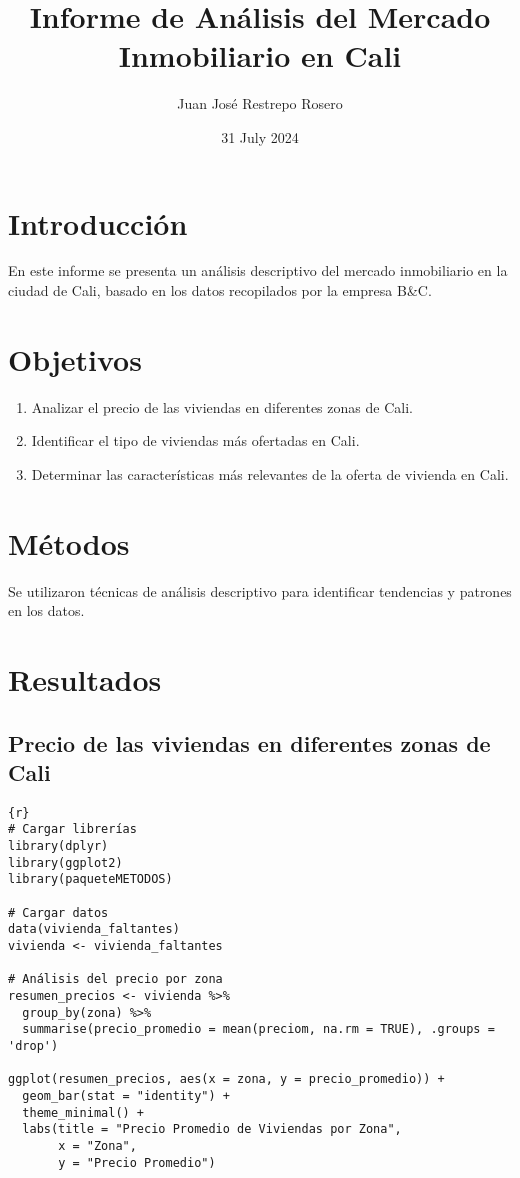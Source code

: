 \documentclass[
]{article}
\title{Informe de Análisis del Mercado Inmobiliario en Cali}
\author{Juan José Restrepo Rosero}
\date{31 July 2024}
\providecommand{\tightlist}{%
  \setlength{\itemsep}{0pt}\setlength{\parskip}{0pt}}
\begin{document}
\maketitle

\section{Introducción}\label{introducciuxf3n}

En este informe se presenta un análisis descriptivo del mercado
inmobiliario en la ciudad de Cali, basado en los datos recopilados por
la empresa B\&C.

\section{Objetivos}\label{objetivos}

\begin{enumerate}
\def\labelenumi{\arabic{enumi}.}
\tightlist
\item
  Analizar el precio de las viviendas en diferentes zonas de Cali.
\item
  Identificar el tipo de viviendas más ofertadas en Cali.
\item
  Determinar las características más relevantes de la oferta de vivienda
  en Cali.
\end{enumerate}

\section{Métodos}\label{muxe9todos}

Se utilizaron técnicas de análisis descriptivo para identificar
tendencias y patrones en los datos.

\section{Resultados}\label{resultados}

\subsection{Precio de las viviendas en diferentes zonas de
Cali}\label{precio-de-las-viviendas-en-diferentes-zonas-de-cali}

\begin{verbatim}
{r}
# Cargar librerías
library(dplyr)
library(ggplot2)
library(paqueteMETODOS)

# Cargar datos
data(vivienda_faltantes)
vivienda <- vivienda_faltantes

# Análisis del precio por zona
resumen_precios <- vivienda %>%
  group_by(zona) %>%
  summarise(precio_promedio = mean(preciom, na.rm = TRUE), .groups = 'drop')

ggplot(resumen_precios, aes(x = zona, y = precio_promedio)) +
  geom_bar(stat = "identity") +
  theme_minimal() +
  labs(title = "Precio Promedio de Viviendas por Zona",
       x = "Zona",
       y = "Precio Promedio")
\end{verbatim}
\end{document}
